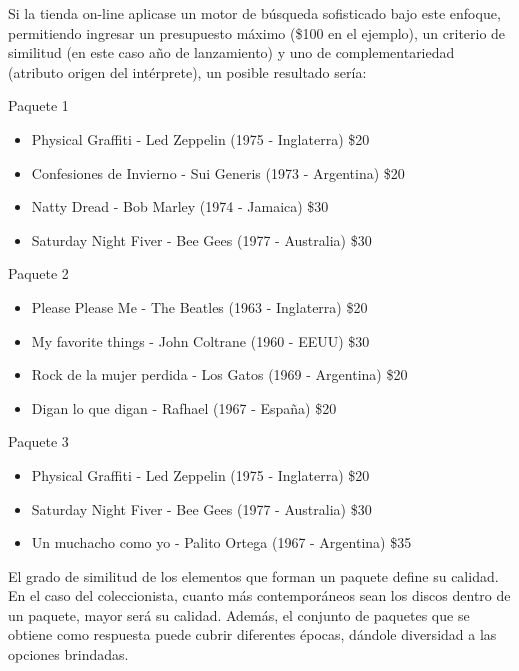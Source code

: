 Si la tienda on-line aplicase un motor de búsqueda sofisticado bajo este enfoque, permitiendo ingresar un presupuesto máximo (\$100 en el ejemplo), un criterio de similitud (en este caso año de lanzamiento) y uno de complementariedad (atributo origen del intérprete), un posible resultado sería:

\begin{mybox}{Paquete 1}
	\begin{itemize}
		\item {\scriptsize Physical Graffiti - Led Zeppelin (1975 - Inglaterra) \$20}
		\item {\scriptsize Confesiones de Invierno - Sui Generis (1973 - Argentina) \$20}
		\item {\scriptsize Natty Dread - Bob Marley (1974 - Jamaica) \$30}
		\item {\scriptsize Saturday Night Fiver - Bee Gees (1977 - Australia) \$30}
	\end{itemize}
\end{mybox}

\begin{mybox}{Paquete 2}
	\begin{itemize}
		\item {\scriptsize Please Please Me - The Beatles (1963 - Inglaterra) \$20}
		\item {\scriptsize My favorite things - John Coltrane (1960 - EEUU) \$30}
		\item {\scriptsize Rock de la mujer perdida - Los Gatos (1969 - Argentina) \$20}
		\item {\scriptsize Digan lo que digan - Rafhael (1967 - España) \$20}
	\end{itemize}
\end{mybox}

\begin{mybox}{Paquete 3}
	\begin{itemize}
		\item {\scriptsize Physical Graffiti - Led Zeppelin (1975 - Inglaterra) \$20}
		\item {\scriptsize Saturday Night Fiver - Bee Gees (1977 - Australia) \$30}
		\item {\scriptsize Un muchacho como yo - Palito Ortega (1967 - Argentina) \$35}
	\end{itemize}
\end{mybox}

El grado de similitud de los elementos que forman un paquete define su calidad. En el caso del coleccionista, cuanto más contemporáneos sean los discos dentro de un paquete, mayor será su calidad. Además, el conjunto de paquetes que se obtiene como respuesta puede cubrir diferentes épocas, dándole diversidad a las opciones brindadas. 

